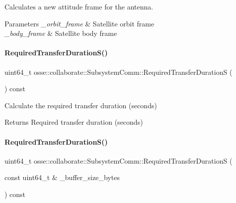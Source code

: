 Calculates a new attitude frame for the antenna. 


\begin{DoxyParams}{Parameters}
{\em \+\_\+orbit\+\_\+frame} & Satellite orbit frame \\
\hline
{\em \+\_\+body\+\_\+frame} & Satellite body frame \\
\hline
\end{DoxyParams}
\mbox{\label{classosse_1_1collaborate_1_1_subsystem_comm_ae3626e8fd31433972e7b69aa25fb9375}} 
\paragraph{\texorpdfstring{Required\+Transfer\+Duration\+S()}{RequiredTransferDurationS()}\hspace{0.1cm}{\footnotesize\ttfamily [1/2]}}
{\footnotesize\ttfamily uint64\+\_\+t osse\+::collaborate\+::\+Subsystem\+Comm\+::\+Required\+Transfer\+DurationS (\begin{DoxyParamCaption}{ }\end{DoxyParamCaption}) const}



Calculate the required transfer duration (seconds) 

\begin{DoxyReturn}{Returns}
Required transfer duration (seconds) 
\end{DoxyReturn}
\mbox{\label{classosse_1_1collaborate_1_1_subsystem_comm_a7c3f63458bc096bbe875aea53d2bf748}} 
\paragraph{\texorpdfstring{Required\+Transfer\+Duration\+S()}{RequiredTransferDurationS()}\hspace{0.1cm}{\footnotesize\ttfamily [2/2]}}
{\footnotesize\ttfamily uint64\+\_\+t osse\+::collaborate\+::\+Subsystem\+Comm\+::\+Required\+Transfer\+DurationS (\begin{DoxyParamCaption}\item[{const uint64\+\_\+t \&}]{\+\_\+buffer\+\_\+size\+\_\+bytes }\end{DoxyParamCaption}) const}



